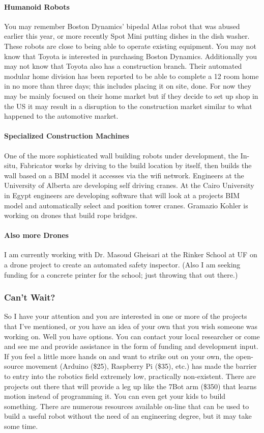 \documentclass[11pt]{article}
\begin{document}
\paragraph{Humanoid Robots}
You may remember Boston Dynamics' bipedal Atlas robot that was abused earlier this year, or more recently Spot Mini putting dishes in the dish washer.  These robots are close to being able to operate existing equipment.  You may not know that Toyota is interested in purchasing Boston Dynamics.  Additionally you may not know that Toyota also has a construction branch.  Their automated  modular home division has been reported to be able to complete a 12 room home in no more than three days; this includes placing it on site, done.  For now they may be mainly focused on their home market but if they decide to set up shop in the US it may result in a disruption to the construction market similar to what happened to the automotive market.
\paragraph{Specialized Construction Machines}
One of the more sophisticated wall building robots under development, the In-situ, Fabricator works by driving to the build location by itself, then builds the wall based on a BIM model it accesses via the wifi network.  Engineers at the University of Alberta are developing self driving cranes.  At the Cairo University in Egypt engineers are developing software that will look at a projects BIM model and automatically select and position tower cranes.  Gramazio Kohler is working on drones that build rope bridges.
\paragraph{Also more Drones}
I am currently working with Dr. Masoud Gheisari at the Rinker School at UF on a drone project to create an automated safety inspector.  (Also I am seeking funding for a concrete printer for the school; just throwing that out there.)
\subsubsection{Can't Wait?}
So I have your attention and you are interested in one or more of the projects that I've mentioned, or you have an idea of your own that you wish someone was working on.  Well you have options.  You can contact your local researcher or come and see me and provide assistance in the form of funding and development input.  If you feel a little more hands on and want to strike out on your own, the open-source movement (Arduino (\$25), Raspberry Pi (\$35), etc.) has made the barrier to entry into the robotics field extremely low, practically non-existent.  There are projects out there that will provide a leg up like the 7Bot arm (\$350) that learns motion instead of programming it.  You can even get your kids to build something.  There are numerous resources available on-line that can be used to build a useful robot without the need of an engineering degree, but it may take some time.
\end{document}
